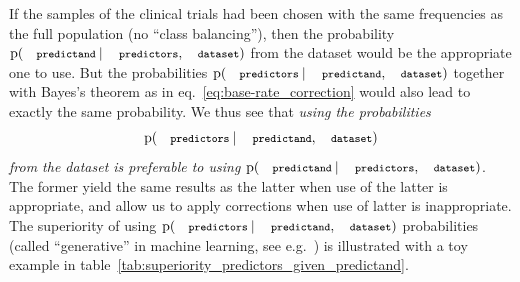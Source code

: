 \documentclass[utf8]{FrontiersinHarvard} %
\newcommand*{\sect}{\S}%
\newcommand*{\eqn}{eq.}%
\newcommand*{\eg}{{e.g.}}
\newcommand*{\p}{\mathrm{p}}%
\renewcommand*{\|}[1][]{\nonscript\:#1\vert\nonscript\:\mathopen{}}
\newcommand*{\predictors}{\texttt{\footnotesize predictors}}
\newcommand*{\predictand}{\texttt{\footnotesize predictand}}
\newcommand*{\dataset}{\texttt{\footnotesize dataset}}
\begin{document}
If the samples of the clinical trials had been chosen with the same frequencies as the full population (no \enquote{class balancing}), then the probability $\p(\predictand \| \predictors, \dataset)$ from the dataset would be the appropriate one to use. But the probabilities $\p(\predictors \| \predictand, \dataset)$ together with Bayes's theorem as in \eqn~\eqref{eq:base-rate_correction} would also lead to exactly the same probability. We thus see that \emph{using the probabilities}
\[\p(\predictors \| \predictand, \dataset)\]
\emph{from the dataset is preferable to using} $\p(\predictand \| \predictors, \dataset)$. The former yield the same results as the latter when use of the latter is appropriate, and allow us to apply corrections when use of latter is inappropriate. The superiority of using $\p(\predictors \| \predictand, \dataset)$ probabilities (called \enquote{generative} in machine learning, see \eg\ \citealp[\sect~8.6]{murphy2012}) is illustrated with a toy example in table~\ref{tab:superiority_predictors_given_predictand}.
\end{document}
